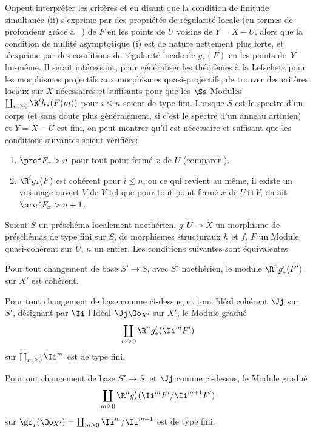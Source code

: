 \begin{remarque} \label{XII.5.6}
On\pageoriginale peut interpr\'eter les crit\`eres  et  en disant que la \og condition de finitude simultan\'ee\fg {} (ii) s'exprime par des propri\'et\'es de r\'egularit\'e locale (en termes de profondeur gr\^ace \`a ~) de $F$ en les points de $U$ voisins de $Y=X- U$, alors que la \og condition de nullit\'e asymptotique\fg {} (i) est de nature nettement plus forte, et s'exprime par des conditions de r\'egularit\'e locale de $g_\ast(F)$ en les points de~$Y$ lui-m\^eme. Il serait int\'eressant, pour g\'en\'eraliser les th\'eor\`emes \`a la Lefschetz pour les morphismes projectifs aux morphismes quasi-projectifs, de trouver des crit\`eres locaux sur $X$ n\'ecessaires et suffisants pour que les $\Ss$-Modules $\coprod_{m\geq 0} \R^ih_\ast(F(m))$ pour $i\leq n$ soient de type fini. Lorsque $S$ est le spectre d'un corps (et sans doute plus g\'en\'eralement, si c'est le spectre d'un anneau artinien) et $Y=X- U$ est fini, on peut montrer qu'il est n\'ecessaire et suffisant que les conditions suivantes soient v\'erifi\'ees:
\begin{enumerate}
\item[\textup{1\noo)}] $\prof F_x >n$ pour tout point ferm\'e $x$ de $U$ (comparer ).
\item[\textup{2\noo)}] $\R^ig_\ast(F)$ est coh\'erent pour $i\leq n$, ou ce qui revient au m\^eme, il existe un voisinage ouvert $V$ de $Y$ tel que pour tout point ferm\'e $x$ de $U\cap V$, on ait $\prof F_x >n+1$.
\end{enumerate}
\end{remarque}

\begin{proposition} \label{XII.5.7}
Soient $S$ un pr\'esch\'ema localement noeth\'erien, $g:U\to X$ un morphisme de pr\'esch\'emas de type fini sur $S$, de morphismes structuraux $h$ et $f$, $F$ un Module quasi-coh\'erent sur $U$, $n$ un entier. Les conditions suivantes sont \'equivalentes:
\begin{enumeratei}
\item
Pour tout changement de base $S'\to S$, avec $S'$ noeth\'erien, le module $\R^ng'_\ast(F')$ sur $X'$ est coh\'erent.
\item
Pour tout changement de base comme ci-dessus, et tout Id\'eal coh\'erent $\Jj$ sur~$S'$, d\'esignant par $\Ii$ l'Id\'eal $\Jj\Oo_{X'}$ sur $X'$, le Module gradu\'e
\[
\coprod_{m\geq 0} \R^ng'_\ast(\Ii^mF')
\]
sur $\coprod_{m\geq 0} \Ii^m$ est de type fini.
\item
Pour\pageoriginale tout changement de base $S'\to S$, et $\Jj$ comme ci-dessus, le Module gradu\'e
\[
\coprod_{m\geq 0} \R^ng'_\ast(\Ii^mF'/\Ii^{m+1}F')
\]
sur $\gr_I(\Oo_{X'})=\coprod_{m\geq 0} \Ii^m/\Ii^{m+1}$ est de type fini.
\end{enumeratei}
\end{proposition}

